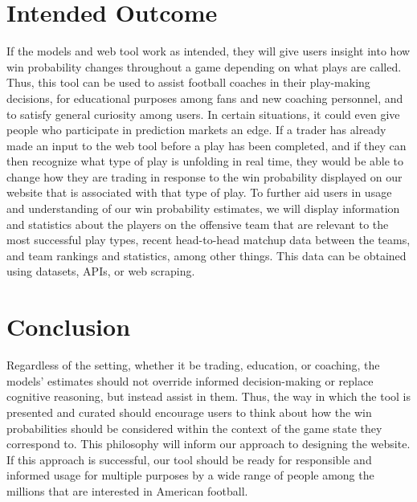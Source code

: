 \documentclass[conference]{IEEEtran}
\begin{document}
\section{Intended Outcome}
If the models and web tool work as intended, they will give users insight into
how win probability changes throughout a game depending on what plays are called.
Thus, this tool can be used to assist football coaches in their play-making
decisions, for educational purposes among fans and new coaching personnel, and
to satisfy general curiosity among users. In certain situations, it could even
give people who participate in prediction markets an edge. If a trader has
already made an input to the web tool before a play has been completed, and if they
can then recognize what type of play is unfolding in real time, they would be
able to change how they are trading in response to the win probability
displayed on our website that is associated with that type of play. To further
aid users in usage and understanding of our win probability estimates, we will
display information and statistics about the players on the offensive team
that are relevant to the most successful play types, recent head-to-head matchup
data between the teams, and team rankings and statistics, among other things.
This data can be obtained using datasets, APIs, or web scraping.

\section{Conclusion}
Regardless of the setting, whether it be trading, education, or coaching, the
models' estimates should not override informed decision-making or replace
cognitive reasoning, but instead assist in them. Thus, the way in which the
tool is presented and curated should encourage users to think about how the
win probabilities should be considered within the context of the game state
they correspond to. This philosophy will inform our approach to designing the
website. If this approach is successful, our tool should be ready for
responsible and informed usage for multiple purposes by a wide range of people
among the millions that are interested in American football.
\end{document}

